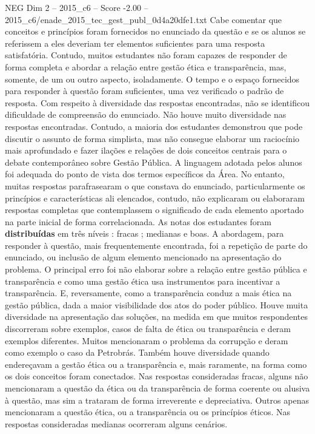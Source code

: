 \begin{textsample}{NEG Dim 2 – 2015\_c6 – Score -2.00 – 2015\_c6/enade\_2015\_tec\_gest\_publ\_0d4a20dfe1.txt}
Cabe comentar que conceitos e princípios foram fornecidos no enunciado da questão e se os alunos se referissem a eles deveriam ter elementos suficientes para uma resposta satisfatória.
Contudo, muitos estudantes não foram capazes de responder de forma completa e abordar a relação entre gestão ética e transparência, mas, somente, de um ou outro aspecto, isoladamente.
O tempo e o espaço fornecidos para responder à questão foram suficientes, uma vez verificado o padrão de resposta.
Com respeito à diversidade das respostas encontradas, não se identificou dificuldade de compreensão do enunciado.
Não houve muito diversidade nas respostas encontradas.
Contudo, a maioria dos estudantes demonstrou que pode discutir o assunto de forma simplista, mas não consegue elaborar um raciocínio mais aprofundado e fazer ilações e relações de dois conceitos centrais para o debate contemporâneo sobre Gestão Pública.
A linguagem adotada pelos alunos foi adequada do ponto de vista dos termos específicos da Área.
No entanto, muitas respostas parafrasearam o que constava do enunciado, particularmente os princípios e características ali elencados, contudo, não explicaram ou elaboraram respostas completas que contemplassem o significado de cada elemento aportado na parte inicial de forma correlacionada.
As notas dos estudantes foram \textbf{distribuídas} em três níveis : fracas ; medianas e boas.
A abordagem, para responder à questão, mais frequentemente encontrada, foi a repetição de parte do enunciado, ou inclusão de algum elemento mencionado na apresentação do problema.
O principal erro foi não elaborar sobre a relação entre gestão pública e transparência e como uma gestão ética usa instrumentos para incentivar a transparência.
E, reversamente, como a transparência conduz a mais ética na gestão pública, dada a maior visibilidade dos atos do poder público.
Houve muita diversidade na apresentação das soluções, na medida em que muitos respondentes discorreram sobre exemplos, casos de falta de ética ou transparência e deram exemplos diferentes.
Muitos mencionaram o problema da corrupção e deram como exemplo o caso da Petrobrás.
Também houve diversidade quando endereçavam a gestão ética ou a transparência e, mais raramente, na forma como os dois conceitos foram conectados.
Nas respostas consideradas fracas, alguns não mencionaram a questão da ética ou da transparência de forma coerente ou alusiva à questão, mas sim a trataram de forma irreverente e depreciativa.
Outros apenas mencionaram a questão ética, ou a transparência ou os princípios éticos.
Nas respostas consideradas medianas ocorreram alguns cenários.

\end{textsample}
